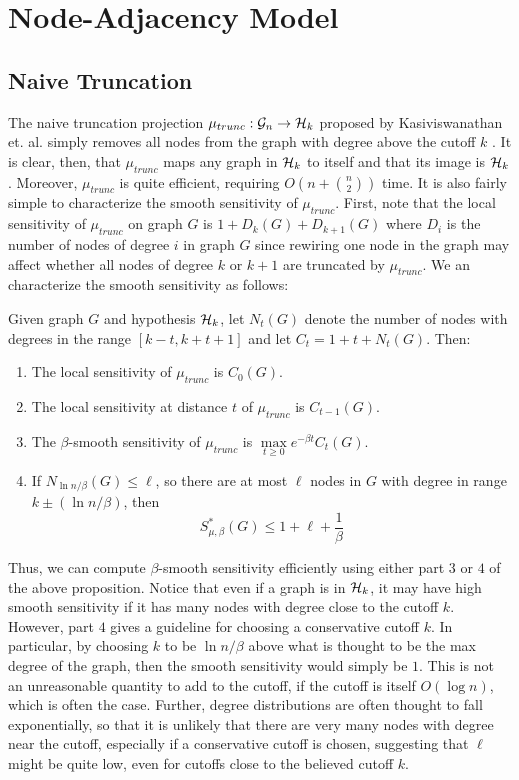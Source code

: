 \section{Node-Adjacency Model}

\subsection*{Naive Truncation}

The naive truncation projection $\mu_{trunc}: \mathcal{G}_n \to \mathcal{H}_{k}$ proposed by Kasiviswanathan et. al. simply removes all nodes from the graph with degree above the cutoff $k$ \cite{KNRS13}. It is clear, then, that $\mu_{trunc}$ maps any graph in $\mathcal{H}_k$ to itself and that its image is $\mathcal{H}_k$. Moreover, $\mu_{trunc}$ is quite efficient, requiring $O(n + \binom{n}{2})$ time. It is also fairly simple to characterize the smooth sensitivity of $\mu_{trunc}$. First, note that the local sensitivity of $\mu_{trunc}$ on graph $G$ is $1 + D_k(G) + D_{k+1}(G)$ where  $D_{i}$ is the number of nodes of degree $i$ in graph $G$ since rewiring one node in the graph may affect whether all nodes of degree $k$ or $k+1$ are truncated by $\mu_{trunc}$. We an characterize the smooth sensitivity as follows:

\begin{proposition}
Given graph $G$ and hypothesis $\mathcal{H}_k$, let $N_t(G)$ denote the number of nodes with degrees in the range $[k - t, k+ t+ 1]$ and let $C_t = 1 + t+ N_t(G)$. Then:
\begin{enumerate}
	\item The local sensitivity of $\mu_{trunc}$ is $C_0(G)$.
	\item The local sensitivity at distance $t$ of $\mu_{trunc}$ is $C_{t-1}(G)$. 
	\item The $\beta$-smooth sensitivity of $\mu_{trunc}$ is $\max\limits_{t \geq 0} e^{-\beta t} C_{t}(G)$.
	\item If $N_{\ln n/\beta} (G) \leq \ell$, so there are at most $\ell$ nodes in $G$ with degree in range $k \pm (\ln n/\beta)$, then 
	$$S^*_{\mu, \beta}(G) \leq 1 + \ell + \frac{1}{\beta}$$
\end{enumerate}

Thus, we can compute $\beta$-smooth sensitivity efficiently using either part $3$ or $4$ of the above proposition. Notice that even if a graph is in $\mathcal{H}_k$, it may have high smooth sensitivity if it has many nodes with degree close to the cutoff $k$. However, part $4$ gives a guideline for choosing a conservative cutoff $k$. In particular, by choosing $k$ to be $\ln n  / \beta$ above what is thought to be the max degree of the graph, then the smooth sensitivity would simply be $1$. This is not an unreasonable quantity to add to the cutoff, if the cutoff is itself $O(\log n)$, which is often the case. Further, degree distributions are often thought to fall exponentially, so that it is unlikely that there are very many nodes with degree near the cutoff, especially if a conservative cutoff is chosen, suggesting that $\ell$ might be quite low, even for cutoffs close to the believed cutoff $k$.

\end{proposition}

